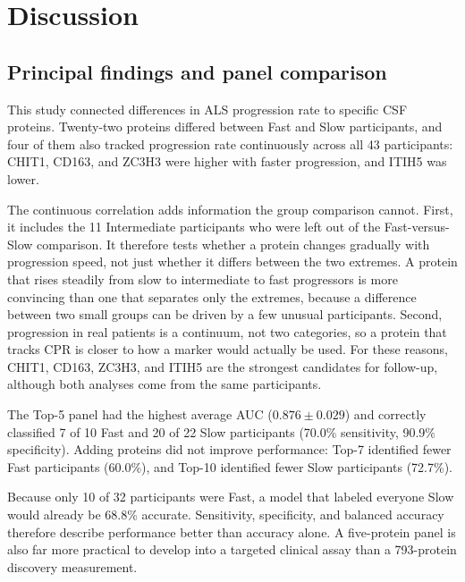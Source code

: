 \documentclass[11pt,letterpaper]{article}
\begin{document}
\section{Discussion}

\subsection{Principal findings and panel comparison}

This study connected differences in ALS progression rate to specific CSF proteins. Twenty-two proteins differed between Fast and Slow participants, and four of them also tracked progression rate continuously across all 43 participants: CHIT1, CD163, and ZC3H3 were higher with faster progression, and ITIH5 was lower.

The continuous correlation adds information the group comparison cannot. First, it includes the 11 Intermediate participants who were left out of the Fast-versus-Slow comparison. It therefore tests whether a protein changes gradually with progression speed, not just whether it differs between the two extremes. A protein that rises steadily from slow to intermediate to fast progressors is more convincing than one that separates only the extremes, because a difference between two small groups can be driven by a few unusual participants. Second, progression in real patients is a continuum, not two categories, so a protein that tracks CPR is closer to how a marker would actually be used. For these reasons, CHIT1, CD163, ZC3H3, and ITIH5 are the strongest candidates for follow-up, although both analyses come from the same participants.

The Top-5 panel had the highest average AUC ($0.876 \pm 0.029$) and correctly classified 7 of 10 Fast and 20 of 22 Slow participants (70.0\% sensitivity, 90.9\% specificity). Adding proteins did not improve performance: Top-7 identified fewer Fast participants (60.0\%), and Top-10 identified fewer Slow participants (72.7\%).

Because only 10 of 32 participants were Fast, a model that labeled everyone Slow would already be 68.8\% accurate. Sensitivity, specificity, and balanced accuracy therefore describe performance better than accuracy alone. A five-protein panel is also far more practical to develop into a targeted clinical assay than a 793-protein discovery measurement.
\end{document}
